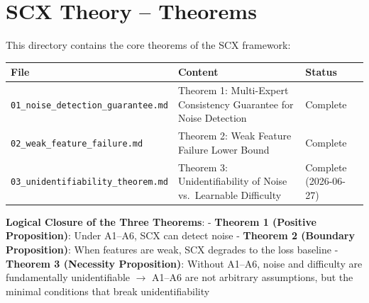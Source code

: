 \documentclass[
  12pt,
]{article}
\author{SCX}
\date{2026}
\begin{document}
\section{SCX Theory -- Theorems}\label{scx-theory-theorems}

This directory contains the core theorems of the SCX framework:

\begin{longtable}[]{@{} >{\raggedright\arraybackslash}p{} >{\raggedright\arraybackslash}p{} >{\raggedright\arraybackslash}p{}@{}}
\toprule\noalign{}
\begin{minipage}[b]{\linewidth}\raggedright
File
\end{minipage} & \begin{minipage}[b]{\linewidth}\raggedright
Content
\end{minipage} & \begin{minipage}[b]{\linewidth}\raggedright
Status
\end{minipage} \\
\midrule\noalign{}
\endhead
\bottomrule\noalign{}
\endlastfoot
\texttt{01\_noise\_detection\_guarantee.md} & Theorem 1:
Multi-Expert Consistency Guarantee for Noise Detection & Complete \\
\texttt{02\_weak\_feature\_failure.md} & Theorem 2: Weak Feature Failure Lower Bound &
Complete \\
\texttt{03\_unidentifiability\_theorem.md} & Theorem 3:
Unidentifiability of Noise vs.\ Learnable Difficulty & Complete (2026-06-27) \\
\end{longtable}

\textbf{Logical Closure of the Three Theorems}: 
- \textbf{Theorem 1 (Positive Proposition)}: Under A1--A6, SCX can detect noise
- \textbf{Theorem 2 (Boundary Proposition)}: When features are weak, SCX degrades to the loss baseline
- \textbf{Theorem 3 (Necessity Proposition)}: Without A1--A6, noise and difficulty are fundamentally unidentifiable
$\rightarrow$ A1--A6 are not arbitrary assumptions, but the minimal conditions that break unidentifiability
\end{document}
